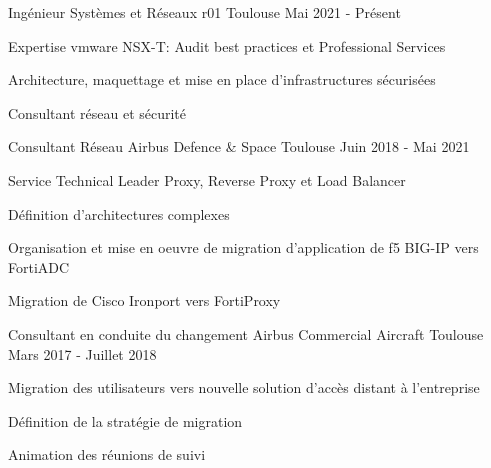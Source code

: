 

\begin{cventries}

  \cventry
    {Ingénieur Systèmes et Réseaux} %
    {r01} %
    {Toulouse} %
    {Mai 2021 - Présent} %
    {
      \begin{cvitems} %
        \item {Expertise vmware NSX-T: Audit best practices et Professional Services}
        \item {Architecture, maquettage et mise en place d'infrastructures sécurisées}
        \item {Consultant réseau et sécurité}
      \end{cvitems}
    }

  \cventry
    {Consultant Réseau} %
    {Airbus Defence \& Space} %
    {Toulouse} %
    {Juin 2018 - Mai 2021} %
    {
      \begin{cvitems} %
        \item {Service Technical Leader Proxy, Reverse Proxy et Load Balancer}
        \item {Définition d'architectures complexes}
        \item {Organisation et mise en oeuvre de migration d'application de f5 BIG-IP vers FortiADC}
        \item {Migration de Cisco Ironport vers FortiProxy}
      \end{cvitems}
    }

  \cventry
    {Consultant en conduite du changement} %
    {Airbus Commercial Aircraft} %
    {Toulouse} %
    {Mars 2017 - Juillet 2018} %
    {
      \begin{cvdoubleitems} %
        \item {Migration des utilisateurs vers nouvelle solution d'accès distant à l'entreprise}
        \item {Définition de la stratégie de migration}
        \item {Animation des réunions de suivi}
      \end{cvdoubleitems}
    }


\end{cventries}
